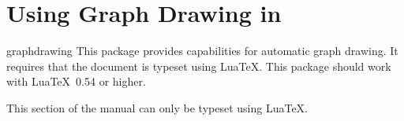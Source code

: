 %
%
%


\section{Using Graph Drawing in \tikzname}

{}

\begin{tikzlibrary}{graphdrawing}
  This package provides capabilities for automatic graph drawing. It
  requires that the document is typeset using Lua\TeX. This package
  should work with Lua\TeX\ 0.54 or higher.
\end{tikzlibrary}

\ifluatex\else This section of the manual can only be typeset using Lua\TeX.\expandafter\endinput\fi


\subsection{Choosing a Layout and a Library}

The graph drawing engine is initalized when you load the library
|graphdrawing|. This library provides the basic framework for graph
drawing, including all options and keys described in the present
section. However, this library does \emph{not} load any actual
algorithms for drawing graphs. For this, you need to use the following
command, which is defined by the |graphdrawing| library:

